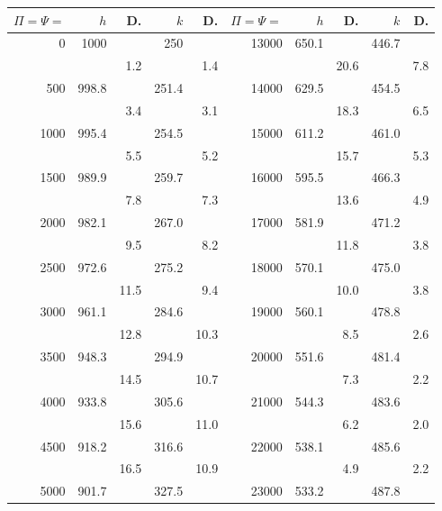 \documentclass[11pt]{article}
\begin{document}
\begin{center}
\begin{tabular}{|r|r|r|r|r||r|r|r|r|r|}
\hline
$\Pi=\Psi=$ & $h$ & D. & $k$ & D. & $\Pi=\Psi=$ & $h$ & D. & $k$ & D. \\ \hline
0    & 1000  &      & 250   &     & 13000 & 650.1 &      & 446.7 &     \\
     &       & 1.2  &       & 1.4 &       &       & 20.6 &       & 7.8 \\
500  & 998.8 &      & 251.4 &     & 14000 & 629.5 &      & 454.5 &     \\
     &       & 3.4  &       & 3.1 &       &       & 18.3 &       & 6.5 \\
1000 & 995.4 &      & 254.5 &     & 15000 & 611.2 &      & 461.0 &     \\
     &       & 5.5  &       & 5.2 &       &       & 15.7 &       & 5.3 \\
1500 & 989.9 &      & 259.7 &     & 16000 & 595.5 &      & 466.3 &     \\
     &       & 7.8  &       & 7.3 &       &       & 13.6 &       & 4.9 \\
2000 & 982.1 &      & 267.0 &     & 17000 & 581.9 &      & 471.2 &     \\
     &       & 9.5  &       & 8.2 &       &       & 11.8 &       & 3.8 \\
2500 & 972.6 &      & 275.2 &     & 18000 & 570.1 &      & 475.0 &     \\
     &       & 11.5 &       & 9.4 &       &       & 10.0 &       & 3.8 \\
3000 & 961.1 &      & 284.6 &     & 19000 & 560.1 &      & 478.8 &     \\
     &       & 12.8 &       & 10.3 &      &       & 8.5  &       & 2.6 \\
3500 & 948.3 &      & 294.9 &     & 20000 & 551.6 &      & 481.4 &     \\
     &       & 14.5 &       & 10.7 &      &       & 7.3  &       & 2.2 \\
4000 & 933.8 &      & 305.6 &     & 21000 & 544.3 &      & 483.6 &     \\
     &       & 15.6 &       & 11.0 &      &       & 6.2  &       & 2.0 \\
4500 & 918.2 &      & 316.6 &     & 22000 & 538.1 &      & 485.6 &     \\
     &       & 16.5 &       & 10.9 &      &       & 4.9  &       & 2.2 \\
5000 & 901.7 &      & 327.5 &     & 23000 & 533.2 &      & 487.8 &     \\

\end{tabular}
\end{center}
\end{document}
